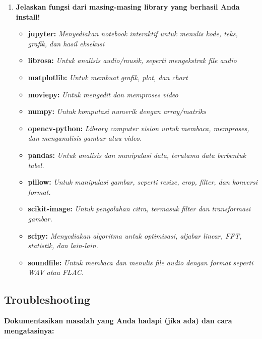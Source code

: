 \documentclass[11pt,a4paper]{article}
\begin{document}
\begin{enumerate}
    \item \textbf{Jelaskan fungsi dari masing-masing library yang berhasil Anda install!}
    \begin{itemize}
        \item \textbf{jupyter:} \textit{Menyediakan notebook interaktif untuk menulis kode, teks, grafik, dan hasil eksekusi}
        \item \textbf{librosa:} \textit{Untuk analisis audio/musik, seperti mengekstrak file audio}
        \item \textbf{matplotlib:} \textit{Untuk membuat grafik, plot, dan chart}
        \item \textbf{moviepy:} \textit{Untuk mengedit dan memproses video}
        \item \textbf{numpy:} \textit{Untuk komputasi numerik dengan array/matriks}
        \item \textbf{opencv-python:} \textit{Library computer vision untuk membaca, memproses, dan menganalisis gambar atau video.}
        \item \textbf{pandas:} \textit{Untuk analisis dan manipulasi data, terutama data berbentuk tabel.}
        \item \textbf{pillow:} \textit{Untuk manipulasi gambar, seperti resize, crop, filter, dan konversi format.}
        \item \textbf{scikit-image:} \textit{Untuk pengolahan citra, termasuk filter dan transformasi gambar.}
        \item \textbf{scipy:} \textit{Menyediakan algoritma untuk optimisasi, aljabar linear, FFT, statistik, dan lain-lain.}
        \item \textbf{soundfile:} \textit{Untuk membaca dan menulis file audio dengan format seperti WAV atau FLAC.}
    \end{itemize}

\end{enumerate}

\subsection{Troubleshooting}
\textbf{Dokumentasikan masalah yang Anda hadapi (jika ada) dan cara mengatasinya:}
\end{document}
